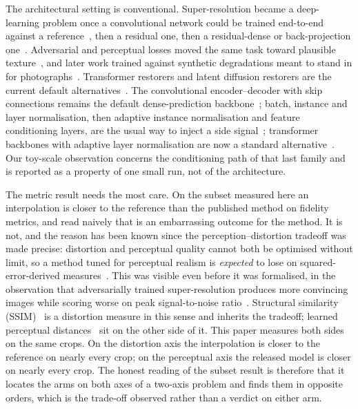 The architectural setting is conventional. Super-resolution became a
deep-learning problem once a convolutional network could be trained end-to-end
against a
reference~\cite{dong2016srcnn,dong2016fsrcnn,kim2016vdsr,kim2016drcn,
shi2016espcn,wang2021survey}, then a residual one, then a residual-dense or
back-projection
one~\cite{he2016resnet,lim2017edsr,lai2017lapsrn,zhang2018rdn,zhang2017dncnn,
haris2018dbpn}. Adversarial and perceptual losses moved the same task toward
plausible texture~\cite{ledig2017srgan,johnson2016perceptual,wang2018esrgan},
and later work trained against synthetic degradations meant to stand in for
photographs~\cite{zhang2021bsrgan,wang2021realesrgan,agustsson2017div2k,
benchmarksubset}. Transformer restorers and latent diffusion restorers are the
current default
alternatives~\cite{vaswani2017attention,dosovitskiy2021vit,liu2021swin,
chen2021ipt,liang2021swinir,zamir2022restormer,ho2020ddpm,rombach2022ldm,
saharia2023sr3,saharia2022palette,releasedmodel}. The convolutional
encoder--decoder with skip connections remains the default dense-prediction
backbone~\cite{ronneberger2015unet}; batch, instance and layer normalisation,
then adaptive instance normalisation and feature conditioning layers, are the
usual way to inject a side
signal~\cite{ba2016layernorm,ulyanov2016instance,dumoulin2017style,
huang2017adain,perez2018film}; transformer backbones with adaptive layer
normalisation are now a standard alternative~\cite{peebles2023dit}. Our
toy-scale observation concerns the conditioning path of that last family and is
reported as a property of one small run, not of the architecture.

The metric result needs the most care. On the subset measured here an
interpolation is closer to the reference than the published method on
fidelity metrics, and read naively that is an embarrassing outcome for the
method. It is not, and the reason has been known since the perception--distortion
tradeoff was made precise: distortion and perceptual quality cannot both be
optimised without limit, so a method tuned for perceptual realism is
\emph{expected} to lose on squared-error-derived measures~\cite{blau2018perception}.
This was visible even before it was formalised, in the observation that
adversarially trained super-resolution produces more convincing images while
scoring worse on peak signal-to-noise
ratio~\cite{ledig2017srgan}. Structural similarity (SSIM)~\cite{wang2004ssim} is a
distortion measure in this sense and inherits the tradeoff; learned perceptual
distances~\cite{zhang2018lpips} sit on the other side of it. This paper
measures both sides on the same crops. On the distortion axis the interpolation
is closer to the reference on nearly every crop; on the perceptual axis the
released model is closer on nearly every crop. The honest reading of the subset
result is therefore that it locates the arms on both axes of a two-axis problem
and finds them in opposite orders, which is the trade-off observed rather than
a verdict on either arm.

